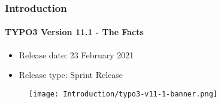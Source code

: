 %

\begin{frame}[fragile]
	\frametitle{Introduction}
	\framesubtitle{TYPO3 Version 11.1 - The Facts}

	\begin{itemize}
		\item Release date: 23 February 2021
		\item Release type: Sprint Release
	\end{itemize}

	\begin{figure}
		\texttt{[image: Introduction/typo3-v11-1-banner.png]}
	\end{figure}

\end{frame}

